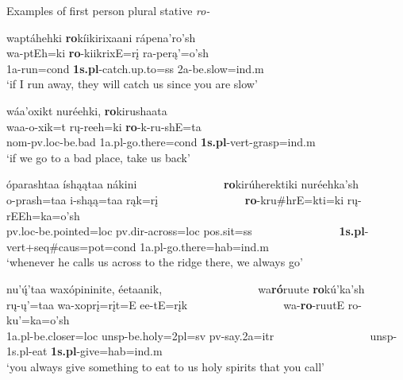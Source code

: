\begin{exe}

\item\label{ExROexamples} Examples of first person plural stative \textit{ro-}

	\begin{xlist}
	
	\item \glll waptáhehki \textbf{ro}kíikirixaani rápena'ro'sh\\
	wa-ptEh=ki \textbf{ro}-kiikrixE=rį ra-perą'=o'sh\\
	1a-\textnormal{run}=cond \textbf{1s.pl}-\textnormal{catch.up.to}=ss 2a-\textnormal{be.slow}=ind.m\\
	\glt `if I run away, they will catch us since you are slow' \citep[163]{hollow1973b}
	
	\item \glll wáa'oxikt nuréehki, \textbf{ro}kirushaata\\
	waa-o-xik=t rų-reeh=ki \textbf{ro}-k-ru-shE=ta\\
	nom-pv.loc-\textnormal{be.bad} 1a.pl-\textnormal{go.there}=cond \textbf{1s.pl}-vert-\textnormal{grasp}=ind.m\\
	\glt `if we go to a bad place, take us back' \citep[45]{hollow1973b}
	
	\item \glll óparashtaa íshąątaa nákini ~ ~ ~ ~ ~ ~ ~ ~ ~ \textbf{ro}kirúherektiki nuréehka'sh\\
		o-prash=taa i-shąą=taa rąk=rį ~ ~ ~ ~ ~ ~ ~ ~ ~  \textbf{ro}-kru\#hrE=kti=ki rų-rEEh=ka=o'sh\\
		pv.loc-\textnormal{be.pointed}=loc pv.dir-\textnormal{across}=loc pos.sit=ss ~ ~ ~ ~ ~ ~ ~ ~ ~ \textbf{1s.pl}-vert+seq\#caus=pot=cond 1a.pl-\textnormal{go.there}=hab=ind.m\\
	\glt	`whenever he calls us across to the ridge there, we always go' \citep[151]{hollow1973b}

	\item \glll nu'ų́'taa waxópininite, éetaanik, ~ ~ ~ ~ ~ ~ ~ ~ ~ ~ wa\textbf{ró}ruute  \textbf{ro}kú'ka'sh\\
	rų-ų'=taa wa-xoprį=rįt=E ee-tE=rįk  ~ ~ ~ ~ ~ ~ ~ ~ ~ ~  wa-\textbf{ro}-ruutE ro-ku'=ka=o'sh\\
	1a.pl-\textnormal{be.closer}=loc unsp-\textnormal{be.holy}=2pl=sv pv-\textnormal{say}.2a=itr  ~ ~ ~ ~ ~ ~ ~ ~ ~ ~  unsp-1s.pl-\textnormal{eat} \textbf{1s.pl}-\textnormal{give}=hab=ind.m\\
	\glt `you always give something to eat to us holy spirits that you call' \citep[176]{hollow1973b}
	

\end{xlist}
\end{exe}
